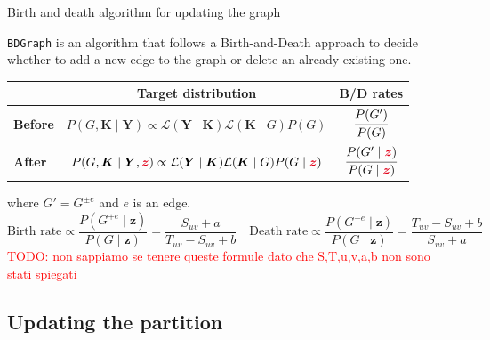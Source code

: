 \begin{frame}{Birth and death algorithm for updating the graph}

    \texttt{BDGraph} is an algorithm that follows a Birth-and-Death approach to decide whether to \alert{add} a new edge to the graph or \alert{delete} an already existing one.

    \pause
    
    \begin{table}[tb]
        \centering
        \begin{tabular}{lcc}
        \toprule
        & Target distribution & B/D rates \\
        \hline
        \textbf{Before} & $P(G,\bm{K} \mid \bm{Y}) \propto \mathcal{L}(\bm{Y} \mid \bm{K})\mathcal{L} (\bm{K} \mid {G})P(G)$ & $\cfrac{P(G')}{P(G)}$ \\
        \textbf{After}  & $P(G,\bm{K} \mid \bm{Y}, \textcolor{sleekRed}{\bm{z}}) \propto \mathcal{L}(\bm{Y} \mid \bm{K})\mathcal{L}(\bm{K} \mid {G})P(G \mid \textcolor{sleekRed}{\bm{z}})$ & $\cfrac{P(G' \mid \textcolor{sleekRed}{\bm{z}})}{P(G \mid \textcolor{sleekRed}{\bm{z}})}$ \\
        \bottomrule
        \end{tabular}
    \end{table}
    where $G' = G^{\pm e}$ and $e$ is an edge.
    \pause
    \[
        \text{Birth rate} \propto \frac{P(G^{+ e}\mid \bm{z})}{P(G\mid \bm{z})} = \frac{S_{uv} + a}{T_{uv} - S_{uv} + b}
        \quad
        \text{Death rate} \propto \frac{P(G^{- e}\mid \bm{z})}{P(G\mid \bm{z})} = \frac{T_{uv} - S_{uv} + b}{S_{uv} + a}
    \]
    \textcolor{red}{TODO: non sappiamo se tenere queste formule dato che S,T,u,v,a,b non sono stati spiegati}
    
\end{frame}

\subsection{Updating the partition}

